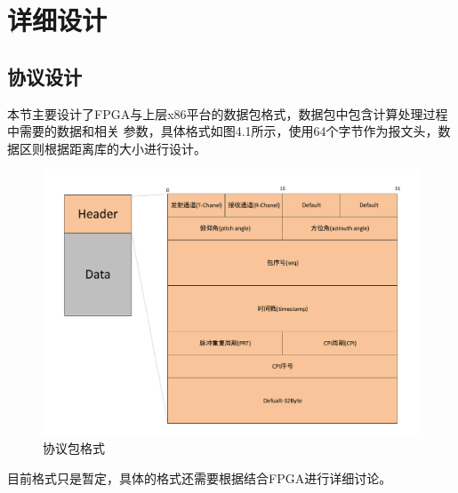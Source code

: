 \documentclass[a4paper,12pt]{report}
\begin{document}
\chapter{详细设计}
\begin{spacing}{1.5}       

\section{协议设计}
本节主要设计了FPGA与上层x86平台的数据包格式，数据包中包含计算处理过程中需要的数据和相关
参数，具体格式如图4.1所示，使用64个字节作为报文头，数据区则根据距离库的大小进行设计。

\begin{figure}[htbp]
    \centering
    \includegraphics [width=1.0\textwidth]{figure//header.pdf}
    \caption{协议包格式}\label{header}
\end{figure}

目前格式只是暂定，具体的格式还需要根据结合FPGA进行详细讨论。


\end{spacing}
\end{document}
